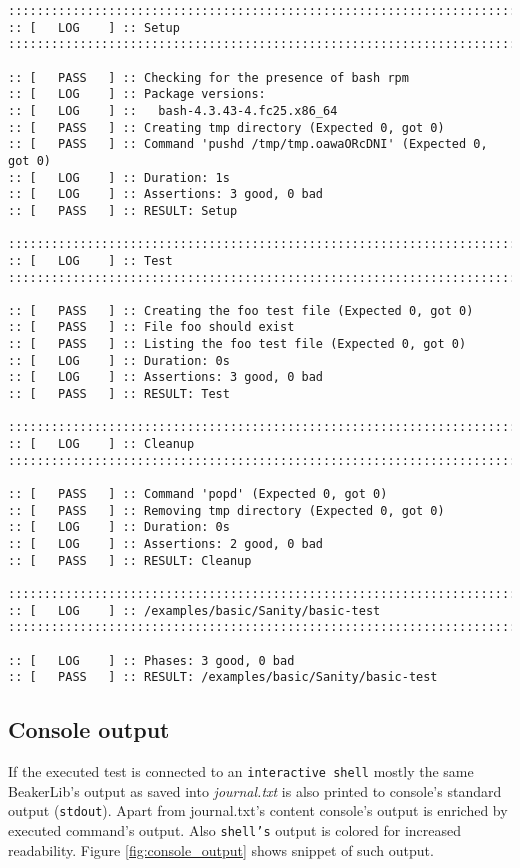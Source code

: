 \begin{lstlisting}[style=txt,caption={Example of journal.txt},label={lst:journaltxt_example}]
::::::::::::::::::::::::::::::::::::::::::::::::::::::::::::::::::::::::::::::::
:: [   LOG    ] :: Setup
::::::::::::::::::::::::::::::::::::::::::::::::::::::::::::::::::::::::::::::::

:: [   PASS   ] :: Checking for the presence of bash rpm
:: [   LOG    ] :: Package versions:
:: [   LOG    ] ::   bash-4.3.43-4.fc25.x86_64
:: [   PASS   ] :: Creating tmp directory (Expected 0, got 0)
:: [   PASS   ] :: Command 'pushd /tmp/tmp.oawaORcDNI' (Expected 0, got 0)
:: [   LOG    ] :: Duration: 1s
:: [   LOG    ] :: Assertions: 3 good, 0 bad
:: [   PASS   ] :: RESULT: Setup

::::::::::::::::::::::::::::::::::::::::::::::::::::::::::::::::::::::::::::::::
:: [   LOG    ] :: Test
::::::::::::::::::::::::::::::::::::::::::::::::::::::::::::::::::::::::::::::::

:: [   PASS   ] :: Creating the foo test file (Expected 0, got 0)
:: [   PASS   ] :: File foo should exist
:: [   PASS   ] :: Listing the foo test file (Expected 0, got 0)
:: [   LOG    ] :: Duration: 0s
:: [   LOG    ] :: Assertions: 3 good, 0 bad
:: [   PASS   ] :: RESULT: Test

::::::::::::::::::::::::::::::::::::::::::::::::::::::::::::::::::::::::::::::::
:: [   LOG    ] :: Cleanup
::::::::::::::::::::::::::::::::::::::::::::::::::::::::::::::::::::::::::::::::

:: [   PASS   ] :: Command 'popd' (Expected 0, got 0)
:: [   PASS   ] :: Removing tmp directory (Expected 0, got 0)
:: [   LOG    ] :: Duration: 0s
:: [   LOG    ] :: Assertions: 2 good, 0 bad
:: [   PASS   ] :: RESULT: Cleanup

::::::::::::::::::::::::::::::::::::::::::::::::::::::::::::::::::::::::::::::::
:: [   LOG    ] :: /examples/basic/Sanity/basic-test
::::::::::::::::::::::::::::::::::::::::::::::::::::::::::::::::::::::::::::::::

:: [   LOG    ] :: Phases: 3 good, 0 bad
:: [   PASS   ] :: RESULT: /examples/basic/Sanity/basic-test
\end{lstlisting}

\subsection{Console output}
If the executed test is connected to an \texttt{interactive shell} mostly the same BeakerLib's output as saved into \textit{journal.txt} is also printed to console's standard output (\texttt{stdout}). Apart from journal.txt's content console's output is enriched by executed command's output. Also \texttt{shell's} output is colored for increased readability.  Figure \ref{fig:console_output} shows snippet of such output.

